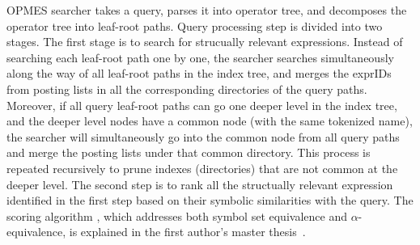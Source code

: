 \documentclass{llncs}
\begin{document}
OPMES searcher takes a query, parses it into operator tree, and decomposes the operator tree into leaf-root paths.
Query processing step is divided into two stages.  The first stage is to search for strucually relevant expressions. 
Instead of searching each leaf-root path one by one, the searcher searches simultaneously along the way of all leaf-root paths in the index tree, and merges the exprIDs from posting lists in all the corresponding directories of the query paths.
Moreover, if all query leaf-root paths can go one deeper level in the index tree, and the deeper level nodes have a common node (with the same tokenized name), the searcher will simultaneously go into the common node from all query paths and merge the posting lists under that common directory.  This process is repeated recursively to prune indexes (directories) that are not common at the deeper level.
The second step is to rank all the structually relevant expression identified in the first step 
based on their symbolic similarities with the query.  
The scoring algorithm , 
which addresses both symbol set equivalence and $\alpha$-equivalence, is explained in 
the first author's master thesis~\cite{mythesis}.
\end{document}
